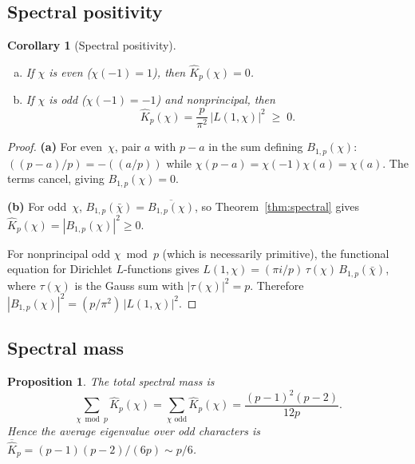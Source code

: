 \documentclass[11pt]{article}
\newtheorem{proposition}[theorem]{Proposition}
\newtheorem{corollary}[theorem]{Corollary}
\theoremstyle{definition}
\begin{document}
\subsection{Spectral positivity}\label{sec:spectral-pos}

\begin{corollary}[Spectral positivity]\label{cor:spectral-pos}
\begin{enumerate}[(a)]
  \item If $\chi$ is \emph{even} ($\chi(-1) = 1$), then
    $\hat{K}_p(\chi) = 0$.
  \item If $\chi$ is \emph{odd} ($\chi(-1) = -1$) and nonprincipal,
    then
    \begin{equation}\label{eq:spectral-L}
      \hat{K}_p(\chi) = \frac{p}{\pi^2}\,|L(1,\chi)|^2 \;\ge\; 0.
    \end{equation}
\end{enumerate}
\end{corollary}

\begin{proof}
\textbf{(a)}  For even~$\chi$, pair $a$ with $p - a$ in the sum
defining $B_{1,p}(\chi)$: $((p-a)/p) = -((a/p))$ while
$\chi(p-a) = \chi(-1)\chi(a) = \chi(a)$.  The terms cancel,
giving $B_{1,p}(\chi) = 0$.

\textbf{(b)}  For odd~$\chi$, $B_{1,p}(\bar{\chi}) = \overline{B_{1,p}(\chi)}$,
so Theorem~\ref{thm:spectral} gives
$\hat{K}_p(\chi) = |B_{1,p}(\chi)|^2 \ge 0$.

For nonprincipal odd $\chi \bmod p$ (which is necessarily primitive),
the functional equation for Dirichlet $L$-functions gives
$L(1,\chi) = (\pi i / p)\,\tau(\chi)\,B_{1,p}(\bar{\chi})$,
where $\tau(\chi)$ is the Gauss sum with $|\tau(\chi)|^2 = p$.
Therefore $|B_{1,p}(\chi)|^2 = (p/\pi^2)\,|L(1,\chi)|^2$.
\end{proof}

\subsection{Spectral mass}\label{sec:spectral-mass}

\begin{proposition}\label{prop:spectral-mass}
The total spectral mass is
\begin{equation}\label{eq:spectral-mass}
  \sum_{\chi \bmod p} \hat{K}_p(\chi)
  = \sum_{\chi \text{ odd}} \hat{K}_p(\chi)
  = \frac{(p-1)^2(p-2)}{12p}.
\end{equation}
Hence the average eigenvalue over odd characters is
$\overline{\hat{K}}_p = (p-1)(p-2)/(6p) \sim p/6$.
\end{proposition}
\end{document}
